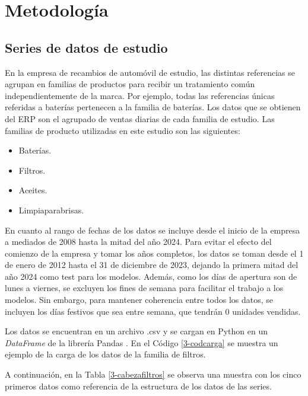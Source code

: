 \chapter{Metodología}\label{cap3}

\section{Series de datos de estudio}

En la empresa de recambios de automóvil de estudio, las distintas referencias se agrupan en familias de productos para recibir un tratamiento común independientemente de la marca. Por ejemplo, todas las referencias únicas referidas a baterías pertenecen a la familia de baterías. Los datos que se obtienen del ERP son el agrupado de ventas diarias de cada familia de estudio. Las familias de producto utilizadas en este estudio son las siguientes:

\begin{itemize}
    \item Baterías.
    \item Filtros.
    \item Aceites.
    \item Limpiaparabrisas.
\end{itemize} 

En cuanto al rango de fechas de los datos se incluye desde el inicio de la empresa a mediados de 2008 hasta la mitad del año 2024. Para evitar el efecto del comienzo de la empresa y tomar los años completos, los datos se toman desde el 1 de enero de 2012 hasta el 31 de diciembre de 2023, dejando la primera mitad del año 2024 como test para los modelos. Además, como los días de apertura son de lunes a viernes, se excluyen los fines de semana para facilitar el trabajo a los modelos. Sin embargo, para mantener coherencia entre todos los datos, se incluyen los días festivos que sea entre semana, que tendrán 0 unidades vendidas.

Los datos se encuentran en un archivo .csv y se cargan en Python en un \textit{DataFrame} de la librería Pandas \cite{pandas}. En el Código \ref*{3-codcarga} se muestra un ejemplo de la carga de los datos de la familia de filtros. 



A continuación, en la Tabla \ref*{3-cabezafiltros} se observa una muestra con los cinco primeros datos como referencia de la estructura de los datos de las series.

